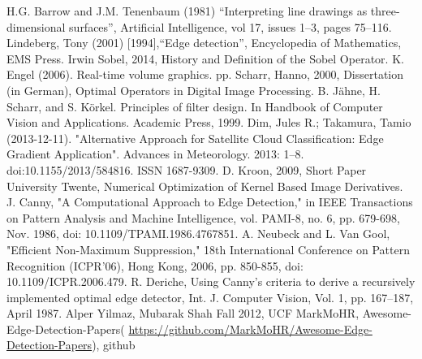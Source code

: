 \documentclass[10pt,twocolumn,letterpaper]{article}
\begin{document}
\begin{thebibliography}{99}
 H.G. Barrow and J.M. Tenenbaum (1981) ``Interpreting line drawings 
as three-dimensional surfaces'', Artificial Intelligence, vol 17, issues 1–3, pages 75–116.
 Lindeberg, Tony (2001) [1994],``Edge detection'', Encyclopedia of 
Mathematics, EMS Press.
 Irwin Sobel, 2014, History and Definition of the Sobel Operator.
 K. Engel (2006). Real-time volume graphics. pp.
 Scharr, Hanno, 2000, Dissertation (in German), Optimal Operators 
in Digital Image Processing. 
 B. Jähne, H. Scharr, and S. Körkel. Principles of filter design. 
In Handbook of Computer Vision and Applications. Academic Press, 1999.
 Dim, Jules R.; Takamura, Tamio (2013-12-11). "Alternative Approach 
for Satellite Cloud Classification: Edge Gradient Application". Advances in Meteorology. 
2013: 1–8. doi:10.1155/2013/584816. ISSN 1687-9309.
 D. Kroon, 2009, Short Paper University Twente, Numerical Optimization 
of Kernel Based Image Derivatives.
 J. Canny, "A Computational Approach to Edge Detection," in IEEE 
Transactions on Pattern Analysis and Machine Intelligence, vol. PAMI-8, no. 6, pp. 679-698, 
Nov. 1986, doi: 10.1109/TPAMI.1986.4767851.
 A. Neubeck and L. Van Gool, "Efficient Non-Maximum Suppression," 
18th International Conference on Pattern Recognition (ICPR'06), Hong Kong, 2006, 
pp. 850-855, doi: 10.1109/ICPR.2006.479.
 R. Deriche, Using Canny's criteria to derive a recursively 
implemented optimal edge detector, Int. J. Computer Vision, Vol. 1, pp. 167–187, April 1987.
 Alper Yilmaz, Mubarak Shah Fall 2012, UCF
 MarkMoHR, Awesome-Edge-Detection-Papers(
\url{https://github.com/MarkMoHR/Awesome-Edge-Detection-Papers}), github
\end{thebibliography}

%
%
\end{document}
